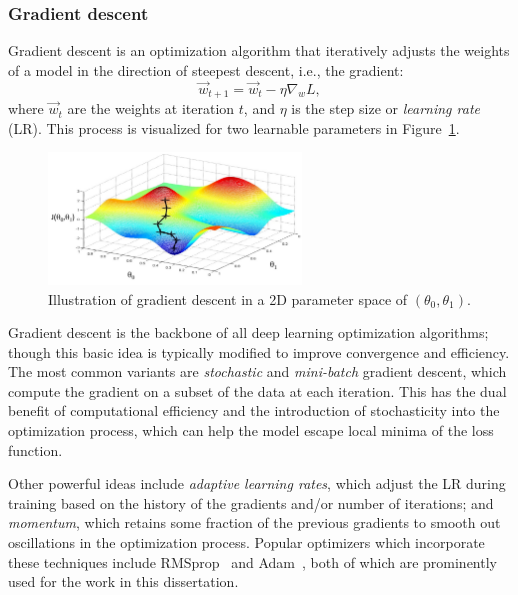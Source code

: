 \subsubsection{Gradient descent}

Gradient descent is an optimization algorithm that iteratively adjusts the weights of a model in the direction of steepest descent, i.e., the gradient:
\begin{equation}
    \label{eq:03_ml_grad_desc}
    \vec{w}_{t+1} = \vec{w}_t - \eta \nabla_w L,
\end{equation}
where $\vec{w}_t$ are the weights at iteration $t$, and $\eta$ is the step size or \textit{learning rate} (LR).
This process is visualized for two learnable parameters in Figure~\ref{fig:03_ml_gradientdescent}.

\begin{figure}[ht]
    \centering
    \includegraphics[width=0.6\textwidth]{figures/03-ML/gradientdescent}
    \caption{Illustration of gradient descent in a 2D parameter space of $(\theta_0, \theta_1)$.}
    \label{fig:03_ml_gradientdescent}
\end{figure}

Gradient descent is the backbone of all deep learning optimization algorithms; though this basic idea is typically modified to improve convergence and efficiency.
The most common variants are \textit{stochastic} and \textit{mini-batch} gradient descent, which compute the gradient on a subset of the data at each iteration.
This has the dual benefit of computational efficiency and the introduction of stochasticity into the optimization process, which can help the model escape local minima of the loss function.

Other powerful ideas include \textit{adaptive learning rates}, which adjust the LR during training based on the history of the gradients and/or number of iterations; and \textit{momentum}, which retains some fraction of the previous gradients to smooth out oscillations in the optimization process.
Popular optimizers which incorporate these techniques include RMSprop~\cite{hinton2012rmsprop} and Adam~\cite{kingma2015adam}, both of which are prominently used for the work in this dissertation.

